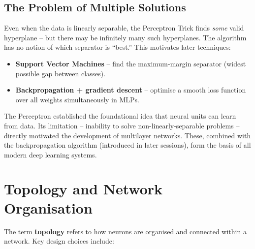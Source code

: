\documentclass[12pt,a4paper]{article}
\begin{document}
\subsection{The Problem of Multiple Solutions}
\label{subsec:multiple-solutions}

Even when the data is linearly separable, the Perceptron Trick finds
\emph{some} valid hyperplane -- but there may be infinitely many such
hyperplanes.
The algorithm has no notion of which separator is ``best.''
This motivates later techniques:

\begin{itemize}
  \item \textbf{Support Vector Machines} -- find the maximum-margin
        separator (widest possible gap between classes).
  \item \textbf{Backpropagation + gradient descent} -- optimise a
        smooth loss function over all weights simultaneously in MLPs.
\end{itemize}

\begin{keyinsight}[title=From Perceptron to Deep Learning]
The Perceptron established the foundational idea that neural units can
learn from data.
Its limitation -- inability to solve non-linearly-separable problems
-- directly motivated the development of multilayer networks.
These, combined with the backpropagation algorithm (introduced in later
sessions), form the basis of all modern deep learning systems.
\end{keyinsight}

\section{Topology and Network Organisation}
\label{sec:topology}

The term \textbf{topology} refers to how neurons are organised and
connected within a network.
Key design choices include:
\end{document}
